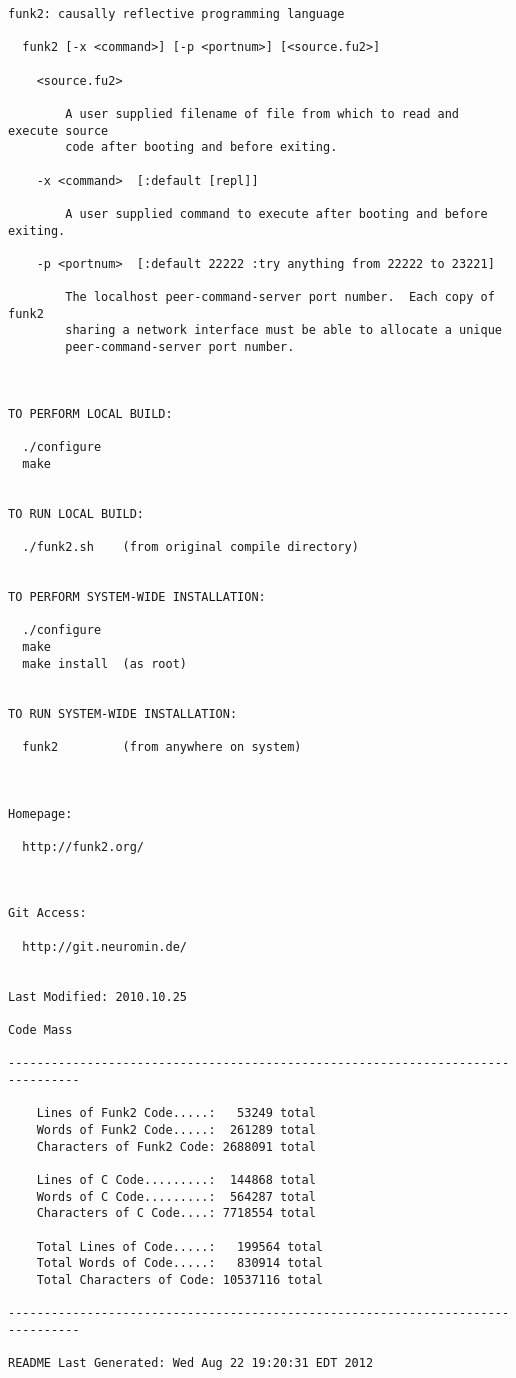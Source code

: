 \lstset{basicstyle=\scriptsize}
\begin{lstlisting}
funk2: causally reflective programming language

  funk2 [-x <command>] [-p <portnum>] [<source.fu2>]

    <source.fu2>

        A user supplied filename of file from which to read and execute source
        code after booting and before exiting.

    -x <command>  [:default [repl]]

        A user supplied command to execute after booting and before exiting.

    -p <portnum>  [:default 22222 :try anything from 22222 to 23221]

        The localhost peer-command-server port number.  Each copy of funk2
        sharing a network interface must be able to allocate a unique
        peer-command-server port number.



TO PERFORM LOCAL BUILD:

  ./configure
  make


TO RUN LOCAL BUILD:

  ./funk2.sh    (from original compile directory)


TO PERFORM SYSTEM-WIDE INSTALLATION:

  ./configure
  make
  make install  (as root)


TO RUN SYSTEM-WIDE INSTALLATION:

  funk2         (from anywhere on system)



Homepage:

  http://funk2.org/



Git Access:

  http://git.neuromin.de/


Last Modified: 2010.10.25

Code Mass

--------------------------------------------------------------------------------

    Lines of Funk2 Code.....:   53249 total
    Words of Funk2 Code.....:  261289 total
    Characters of Funk2 Code: 2688091 total

    Lines of C Code.........:  144868 total
    Words of C Code.........:  564287 total
    Characters of C Code....: 7718554 total

    Total Lines of Code.....:   199564 total
    Total Words of Code.....:   830914 total
    Total Characters of Code: 10537116 total

--------------------------------------------------------------------------------

README Last Generated: Wed Aug 22 19:20:31 EDT 2012
\end{lstlisting}

